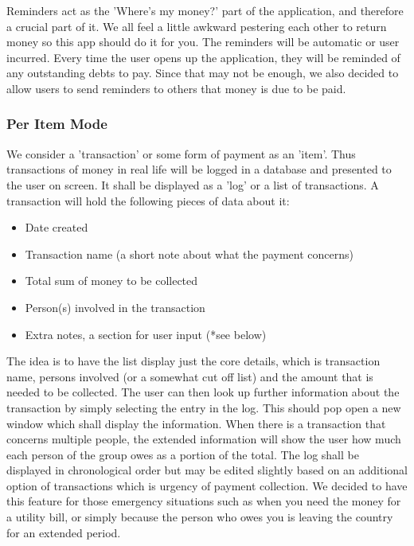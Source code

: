 \documentclass[a4paper,9t]{article}
\begin{document}
Reminders act as the 'Where's my money?' part of the application, and therefore a crucial part of it. We all feel a little awkward pestering each other to return money so this app should do it for you.
The reminders will be automatic or user incurred. Every time the user opens up the application, they will be reminded of any outstanding debts to pay. Since that may not be enough, we also decided to allow users to send reminders to others that money is due to be paid. 

\subsubsection*{Per Item Mode}
We consider a 'transaction' or some form of payment as an 'item'. Thus transactions of money in real life will be logged in a database and presented to the user on screen. It shall be displayed as a 'log' or a list of transactions. 
A transaction will hold the following pieces of data about it:
\begin{itemize}
\item{Date created}
\item{Transaction name (a short note about what the payment concerns)}
\item{Total sum of money to be collected}
\item{Person(s) involved in the transaction}
\item{Extra notes, a section for user input (*see below)}
\end{itemize}
The idea is to have the list display just the core details, which is transaction name, persons involved (or a somewhat cut off list) and the amount that is needed to be collected. The user can then look up further information about the transaction by simply selecting the entry in the log. This should pop open a new window which shall display the information. When there is a transaction that concerns multiple people, the extended information will show the user how much each person of the group owes as a portion of the total.
The log shall be displayed in chronological order but may be edited slightly based on an additional option of transactions which is urgency of payment collection. We decided to have this feature for those emergency situations such as when you need the money for a utility bill, or simply because the person who owes you is leaving the country for an extended period.
\end{document}
